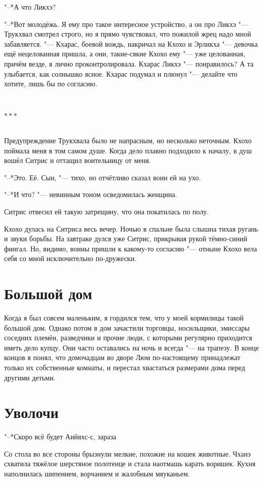 \documentclass[a4paper,10pt]{book}
\newcommand{\ldotst}{\so{...}\xspace}
\newcommand{\ldotse}{\so{!..}\xspace}
\newcommand{\razd}{~\\{\centering\Large\bfseries$\ast \ast \ast$\par}~\\}
\begin{document}
"--*А что Ликхэ?

"--*Вот молодёжь. Я ему про такое интересное устройство, а он про Ликхэ\ldotst 
"--- Трукхвал смотрел строго, но я прямо чувствовал, что пожилой жрец надо мной 
забавляется. "--- Кхарас, боевой вождь, накричал на Кхохо и Эрликха "--- 
девочка ещё нецелованная пришла, а они, такие-сякие\ldotst Кхохо ему "--- уже 
целованная, причём везде, я лично проконтролировала. Кхарас Ликхэ "--- 
понравилось? А та улыбается, как солнышко ясное. Кхарас подумал и плюнул "--- 
делайте что хотите, лишь бы по согласию.

\razd

Предупреждение Трукхвала было не напрасным, но несколько неточным. Кхохо 
поймала меня в том самом душе. Когда дело плавно подходило к началу, в душ 
вошёл Ситрис и оттащил воительницу от меня.

"--*Это. Её. Сын, "--- тихо, но отчётливо сказал воин ей на ухо.

"--*И что? "--- невинным тоном осведомилась женщина.

Ситрис отвесил ей такую затрещину, что она покатилась по полу.

Кхохо дулась на Ситриса весь вечер. Ночью в спальне была слышна тихая ругань и 
звуки борьбы. На завтраке дулся уже Ситрис, прикрывая рукой тёмно-синий фингал. 
Но, видимо, воины пришли к какому-то согласию "--- отныне Кхохо вела себя со 
мной исключительно по-дружески.
 
\section{Большой дом}
 
Когда я был совсем маленьким, я гордился тем, что у моей кормилицы такой 
большой 
дом. Однако потом в дом зачастили торговцы, носильщики, эмиссары соседних 
племён, разведчики и прочие люди, с которыми регулярно приходится иметь дело 
купцу. Они часто оставались на ночь и всегда "--- на трапезу. В конце концов я 
понял, что домочадцам во дворе Люм по-настоящему принадлежат только их 
собственные комнаты, и перестал хвастаться размерами дома перед другими детьми.
 
 
\section{Уволочи}
 
"--*Скоро всё будет\ldotst Аийяхс-с, зараза\ldotse

Со стола во все стороны брызнули мелкие, похожие на кошек животные. Чханэ 
схватила тяжёлое шерстяное полотенце и стала наотмашь карать воришек. Кухня 
наполнилась шипением, ворчанием и жалобным мяуканьем.
\end{document}
